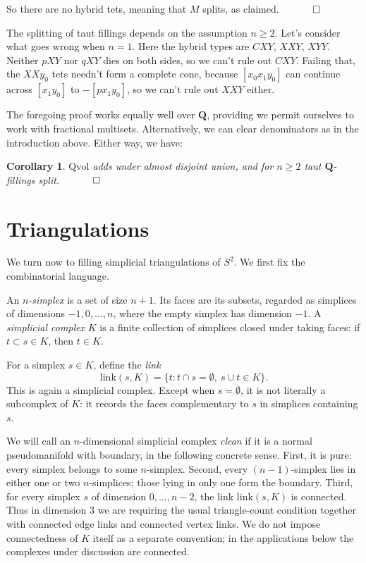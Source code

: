 \documentclass[12pt]{article}
\newtheorem{corollary}{Corollary}
\newcommand{\proofend}{$\quad \qed$}
\def\QQ{\mathbf{Q}}
\newcommand{\kw}{\mathrm}
\newcommand{\link}{\kw{link}}
\newcommand{\Qvol}{\kw{Qvol}}
\begin{document}
So there are no hybrid tets, meaning that $M$ splits, as claimed.
\proofend

The splitting of taut fillings depends on the assumption $n\geq 2$.
Let's consider what goes wrong when $n=1$.
Here the hybrid types are $CXY$, $XXY$, $XYY$.
Neither $pXY$ nor $qXY$ dies on both sides, so we can't rule out $CXY$.
Failing that, the $XXy_0$ tets needn't form a complete cone,
because $[x_0x_1y_0]$ can continue across $[x_1 y_0]$ to $-[p x_1 y_0]$,
so we can't rule out $XXY$ either.

The foregoing proof works equally well over $\QQ$, providing we
permit ourselves to work with fractional multisets.
Alternatively, we can clear denominators as in the introduction
above.
Either way, we have:

\begin{corollary} \label{cor1}
$\Qvol$ adds under almost disjoint union,
and for $n \geq 2$
taut $\QQ$-fillings split.
\proofend
\end{corollary}

\section{Triangulations}

We turn now to filling simplicial triangulations of $S^2$.
We first fix the combinatorial language.

An \emph{$n$-simplex} is a set of size $n+1$.
Its faces are its subsets, regarded as simplices of dimensions
$-1,0,\ldots,n$, where the empty simplex has dimension $-1$.
A \emph{simplicial complex} $K$ is a finite collection of simplices closed
under taking faces: if $t\subset s\in K$, then $t\in K$.

For a simplex $s\in K$, define the \emph{link}
\[
\link(s,K)=\{t: t\cap s=\emptyset,\ s\cup t\in K\}.
\]
This is again a simplicial complex.  Except when $s=\emptyset$, it is not
literally a subcomplex of $K$: it records the faces complementary to $s$ in
simplices containing $s$.

We will call an $n$-dimensional simplicial complex \emph{clean} if it is a
normal pseudomanifold with boundary, in the following concrete sense.
First, it is pure: every simplex belongs to some $n$-simplex.  Second, every
$(n-1)$-simplex lies in either one or two $n$-simplices; those lying in only
one form the boundary.  Third, for every simplex $s$ of dimension
$0,\ldots,n-2$, the link $\link(s,K)$ is connected.  Thus in dimension $3$
we are requiring the usual triangle-count condition together with connected
edge links and connected vertex links.  We do not impose connectedness of
$K$ itself as a separate convention; in the applications below the complexes
under discussion are connected.
\end{document}
